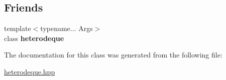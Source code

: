 \subsection*{Friends}
\begin{DoxyCompactItemize}
\item 
\hypertarget{classheterogeneous_1_1heterodeque_3_01_t_00_01_types_8_8_8_4_a3d4800913c2d8380ff48d938c8dfcff5}{}{\footnotesize template$<$typename... Args$>$ }\\class {\bfseries heterodeque}\label{classheterogeneous_1_1heterodeque_3_01_t_00_01_types_8_8_8_4_a3d4800913c2d8380ff48d938c8dfcff5}

\end{DoxyCompactItemize}


The documentation for this class was generated from the following file\+:\begin{DoxyCompactItemize}
\item 
\hyperlink{heterodeque_8hpp}{heterodeque.\+hpp}\end{DoxyCompactItemize}
